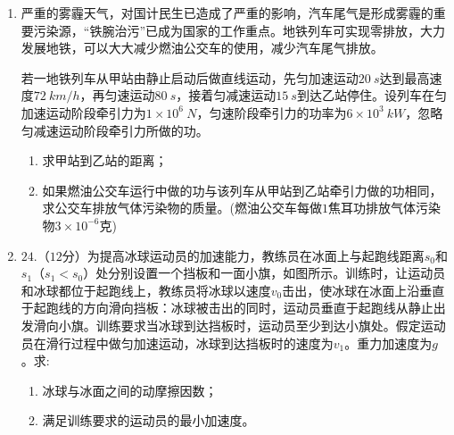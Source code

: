 \begin{enumerate}
\item 
{}
严重的雾霾天气，对国计民生已造成了严重的影响，汽车尾气是形成雾霾的重要污染源，“铁腕治污”已成为国家的工作重点。地铁列车可实现零排放，大力发展地铁，可以大大减少燃油公交车的使用，减少汽车尾气排放。

若一地铁列车从甲站由静止启动后做直线运动，先匀加速运动$ 20 \ s $达到最高速度$ 72 \ km/h $，再匀速运动$ 80 \ s $，接着匀减速运动$ 15 \ s $到达乙站停住。设列车在匀加速运动阶段牵引力为$ 1 \times 10^{6} \ N $，匀速阶段牵引力的功率为$ 6 \times 10^{3} \ kW $，忽略匀减速运动阶段牵引力所做的功。
\begin{enumerate}
\renewcommand{\labelenumi}{\arabic{enumi}.}
\item
求甲站到乙站的距离；
\item 
如果燃油公交车运行中做的功与该列车从甲站到乙站牵引力做的功相同，求公交车排放气体污染物的质量。(燃油公交车每做$ 1 $焦耳功排放气体污染物$ 3 \times 10^{-6} $克)

\end{enumerate}




\newpage
\item 
{}
$ 24 $.（$ 12 $分）为提高冰球运动员的加速能力，教练员在冰面上与起跑线距离$ s_{0} $和$ s_{1} $（$ s_1<s_0 $）处分别设置一个挡板和一面小旗，如图所示。训练时，让运动员和冰球都位于起跑线上，教练员将冰球以速度$ v_{0} $击出，使冰球在冰面上沿垂直于起跑线的方向滑向挡板：冰球被击出的同时，运动员垂直于起跑线从静止出发滑向小旗。训练要求当冰球到达挡板时，运动员至少到达小旗处。假定运动员在滑行过程中做匀加速运动，冰球到达挡板时的速度为$ v_{1} $。重力加速度为$ g $。求:
\begin{enumerate}
\renewcommand{\labelenumi}{\arabic{enumi}.}
\item
冰球与冰面之间的动摩擦因数；
\item 
满足训练要求的运动员的最小加速度。


\end{enumerate}
\end{enumerate}
